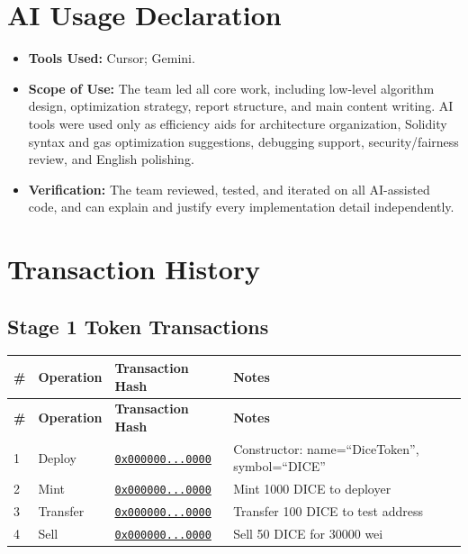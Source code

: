 \documentclass[10pt,a4paper]{article}
\newcommand{\missingtx}{\textcolor{red}{\href{https://sepolia.etherscan.io/tx/0x0000000000000000000000000000000000000000000000000000000000000000}{\texttt{0x000000...0000}}}}
\begin{document}
\section*{AI Usage Declaration}
\begin{itemize}
  \item \textbf{Tools Used:} Cursor; Gemini.
  \item \textbf{Scope of Use:} The team led all core work, including low-level algorithm design, optimization strategy, report structure, and main content writing. AI tools were used only as efficiency aids for architecture organization, Solidity syntax and gas optimization suggestions, debugging support, security/fairness review, and English polishing.
  \item \textbf{Verification:} The team reviewed, tested, and iterated on all AI-assisted code, and can explain and justify every implementation detail independently.
\end{itemize}

\section{Transaction History}
\small

\subsection*{Stage 1 Token Transactions}
\begin{longtable}{@{}p{}p{}p{}p{}@{}}
\toprule
\textbf{\#} & \textbf{Operation} & \textbf{Transaction Hash} & \textbf{Notes} \\
\midrule
\endfirsthead
\toprule
\textbf{\#} & \textbf{Operation} & \textbf{Transaction Hash} & \textbf{Notes} \\
\midrule
\endhead
1 & Deploy & \missingtx & Constructor: name=``DiceToken'', symbol=``DICE'' \\
2 & Mint & \missingtx & Mint 1000 DICE to deployer \\
3 & Transfer & \missingtx & Transfer 100 DICE to test address \\
4 & Sell & \missingtx & Sell 50 DICE for 30000 wei \\
\bottomrule
\end{longtable}
\end{document}
